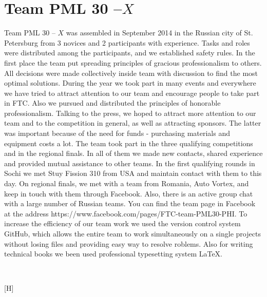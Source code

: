 
\section{Team PML 30 --${X}$} 
Team PML 30 -- ${X}$ was assembled in September 2014 in the Russian city of St. Petersburg from 3 novices and 2 participants with experience. Tasks and roles were distributed among the participants, and we established safety rules. In the first place the team put spreading principles of gracious professionalism to others. All decisions were made collectively inside team with discussion to find the most optimal solutions. 
During the year we took part in many events and everywhere we have tried to attract attention to our team and encourage people to take part in FTC. Also we pursued and distributed the principles of honorable professionalism. Talking to the press, we hoped to attract more attention to our team and to the competition in general, as well as attracting sponsors. The latter was important because of the need for funds - purchasing materials and equipment costs a lot.
The team took part in the three qualifying competitions and in the regional finals. In all of them we made new contacts, shared experience and provided mutual assistance to other teams. In the first qualifying rounds in Sochi we met Stuy Fission 310 from USA and maintain contact with them to this day. On regional finals, we met with a team from Romania, Auto Vortex, and keep in touch with them through Facebook. Also, there is an active group chat with a large number of Russian teams. You can find the team page in Facebook at the address https://www.facebook.com/pages/FTC-team-PML30-PHI.
To increase the efficiency of our team work we used the version control system GitHub, which allows the entire team to work simultaneously on a single projects without losing files and providing easy way to resolve roblems. Also for writing technical books we been used professional typesetting system LaTeX.
\begin{figure}[H]
	\\
\end{figure}[H]
\fillpage

